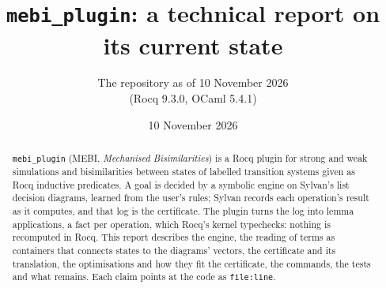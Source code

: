 \documentclass[11pt,a4paper]{article}
\title{\texttt{mebi\_plugin}: a technical report on its current state}
\author{The repository as of 10 November 2026\\ (Rocq 9.3.0, OCaml 5.4.1)}
\date{10 November 2026}
\begin{document}
\maketitle

\begin{abstract}
  \texttt{mebi\_plugin} (MEBI, \emph{Mechanised Bisimilarities}) is a
  Rocq plugin for strong and weak simulations and bisimilarities between
  states of labelled transition systems given as Rocq inductive
  predicates. A goal is decided by a symbolic engine on Sylvan's list
  decision diagrams, learned from the user's rules; Sylvan records each
  operation's result as it computes, and that log is the certificate. The
  plugin turns the log into lemma applications, a fact per operation,
  which Rocq's kernel typechecks: nothing is recomputed in Rocq. This
  report describes the engine, the reading of terms as containers that
  connects states to the diagrams' vectors, the certificate and its
  translation, the optimisations and how they fit the certificate, the
  commands, the tests and what remains. Each claim points at the code as
  \texttt{file:line}.
\end{abstract}

\tableofcontents
\clearpage












\clearpage


\end{document}
